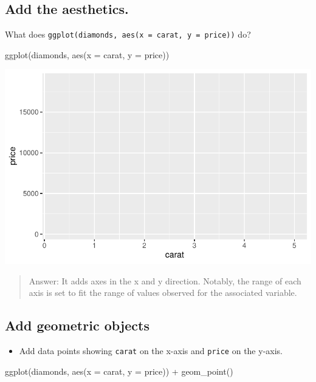 \documentclass[
  letterpaper,
  DIV=11,
  numbers=noendperiod]{scrartcl}
\newenvironment{Shaded}{\begin{snugshade}}{\end{snugshade}}
\newcommand{\AttributeTok}[1]{\textcolor[rgb]{0.40,0.45,0.13}{#1}}
\newcommand{\FunctionTok}[1]{\textcolor[rgb]{0.28,0.35,0.67}{#1}}
\newcommand{\NormalTok}[1]{\textcolor[rgb]{0.00,0.23,0.31}{#1}}
\newcommand{\SpecialCharTok}[1]{\textcolor[rgb]{0.37,0.37,0.37}{#1}}
\providecommand{\tightlist}{%
  \setlength{\itemsep}{0pt}\setlength{\parskip}{0pt}}\usepackage{longtable,booktabs,array}
\begin{document}
\subsection{Add the aesthetics.}\label{add-the-aesthetics.}

What does \texttt{ggplot(diamonds,\ aes(x\ =\ carat,\ y\ =\ price))} do?

\begin{Shaded}
\begin{Highlighting}[]
\FunctionTok{ggplot}\NormalTok{(diamonds, }\FunctionTok{aes}\NormalTok{(}\AttributeTok{x =}\NormalTok{ carat, }\AttributeTok{y =}\NormalTok{ price))}
\end{Highlighting}
\end{Shaded}

\includegraphics{5-ggplot2_kevin_files/figure-pdf/unnamed-chunk-4-1.pdf}

\begin{quote}
Answer: It adds axes in the x and y direction. Notably, the range of
each axis is set to fit the range of values observed for the associated
variable.
\end{quote}

\subsection{Add geometric objects}\label{add-geometric-objects}

\begin{itemize}
\tightlist
\item
  Add data points showing \texttt{carat} on the x-axis and
  \texttt{price} on the y-axis.
\end{itemize}

\begin{Shaded}
\begin{Highlighting}[]
\FunctionTok{ggplot}\NormalTok{(diamonds, }\FunctionTok{aes}\NormalTok{(}\AttributeTok{x =}\NormalTok{ carat, }\AttributeTok{y =}\NormalTok{ price)) }\SpecialCharTok{+}
  \FunctionTok{geom\_point}\NormalTok{()}
\end{Highlighting}
\end{Shaded}
\end{document}
